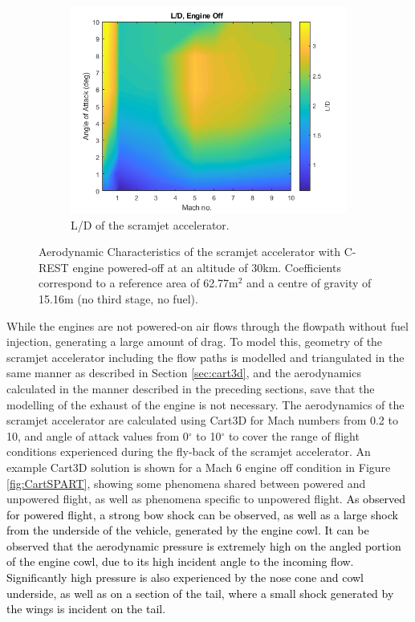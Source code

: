 \begin{figure}[ht]
\begin{subfigure}{.5\textwidth}
		\centering
		\includegraphics[width=0.99\linewidth]{figures/3_vehicle_design/LD}
		\caption{L/D of the scramjet accelerator.}
		\label{fig:LD}
	\end{subfigure}
	\caption{Aerodynamic Characteristics of the scramjet accelerator with C-REST engine powered-off at an altitude of 30km. Coefficients correspond to a reference area of 62.77m$^2$ and a centre of gravity of 15.16m (no third stage, no fuel).} %
	\label{fig:aero1}
\end{figure}


 While the engines are not powered-on air flows through the flowpath without fuel injection, generating a large amount of drag. To model this, geometry of the scramjet accelerator including the flow paths is modelled and triangulated in the same manner as described in Section \ref{sec:cart3d}, and the aerodynamics calculated in the manner described in the preceding sections, save that the modelling of the exhaust of the engine is not necessary.
The aerodynamics of the scramjet accelerator are calculated using Cart3D for Mach numbers from 0.2 to 10, and angle of attack values from 0$^\circ$ to 10$^\circ$ to cover the range of flight conditions experienced during the fly-back of the scramjet accelerator.  An example Cart3D solution is shown for a Mach 6 engine off condition in Figure  \ref{fig:CartSPART}, showing some phenomena shared between powered and unpowered flight, as well as phenomena specific to unpowered flight. \textcolor{black}{As observed for powered flight, a strong bow shock can be observed, as well as a large shock from the underside of the vehicle, generated by the engine cowl. It can be observed that the aerodynamic pressure is extremely high on the angled portion of the engine cowl, due to its high incident angle to the incoming flow. Significantly high pressure is also experienced by the nose cone and cowl underside, as well as on a section of the tail, where a small shock generated by the wings is incident on the tail.}

